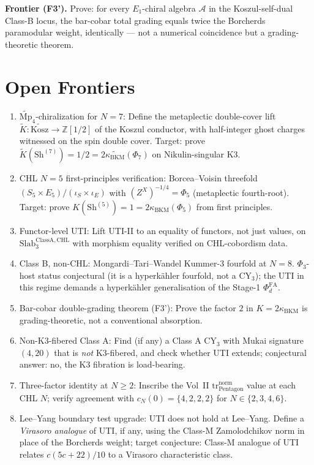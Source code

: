 \documentclass[11pt]{amsart}
\theoremstyle{definition}
\theoremstyle{remark}
\newcommand{\kBKM}{\kappa_{\mathrm{BKM}}}
\newcommand{\PhiFA}{\Phi^{\mathrm{FA}}}
\begin{document}
\textbf{Frontier (F3').} Prove: for every $E_1$-chiral algebra $\mathcal{A}$ in the Koszul-self-dual
Class-B locus, the bar-cobar total grading equals twice the Borcherds paramodular weight,
identically --- not a numerical coincidence but a grading-theoretic theorem.

\section{Open Frontiers}

\begin{enumerate}[label=(\emph{O$_\arabic{*}$})]
\item $\widetilde{\mathrm{Mp}}_4$-chiralization for $N = 7$: Define the metaplectic double-cover
lift $\widetilde{K}: \widetilde{\mathrm{Kosz}} \to \mathbb{Z}[1/2]$ of the Koszul conductor, with
half-integer ghost charges witnessed on the spin double cover. Target: prove
$\widetilde{K}(\mathrm{Sh}^{(7)}) = 1/2 = 2 \widetilde{\kBKM}(\Phi_7)$ on Nikulin-singular K3.

\item CHL $N = 5$ first-principles verification: Borcea--Voisin threefold
$(S_5 \times E_5)/(\iota_S \times \iota_E)$ with $(Z^X)^{-1/4} = \Phi_5$ (metaplectic fourth-root).
Target: prove $K(\mathrm{Sh}^{(5)}) = 1 = 2 \kBKM(\Phi_5)$ from first principles.

\item Functor-level UTI: Lift UTI-II to an equality of functors, not just values, on
$\mathrm{Slab}_3^{\mathrm{ClassA,CHL}}$ with morphism equality verified on CHL-cobordism data.

\item Class B, non-CHL: Mongardi--Tari--Wandel Kummer-$3$ fourfold at $N = 8$. $\Phi_3$-host
status conjectural (it is a hyperk\"ahler fourfold, not a CY$_3$); the UTI in this regime demands
a hyperk\"ahler generalisation of the Stage-1 $\PhiFA_d$.

\item Bar-cobar double-grading theorem (F3'): Prove the factor $2$ in $K = 2\kBKM$ is
grading-theoretic, not a conventional absorption.

\item Non-K3-fibered Class A: Find (if any) a Class A CY$_3$ with Mukai signature $(4, 20)$ that
is \emph{not} K3-fibered, and check whether UTI extends; conjectural answer: no, the K3 fibration
is load-bearing.

\item Three-factor identity at $N \geq 2$: Inscribe the Vol~II
$\mathrm{tr}_{\mathrm{Pentagon}}^{\mathrm{norm}}$ value at each CHL $N$; verify
agreement with $c_N(0) = \{4, 2, 2, 2\}$ for $N \in \{2, 3, 4, 6\}$.

\item Lee--Yang boundary test upgrade: UTI does not hold at Lee--Yang. Define a \emph{Virasoro
analogue} of UTI, if any, using the Class-M Zamolodchikov norm in place of the Borcherds weight;
target conjecture: Class-M analogue of UTI relates $c(5c+22)/10$ to a Virasoro characteristic
class.
\end{enumerate}
\end{document}
